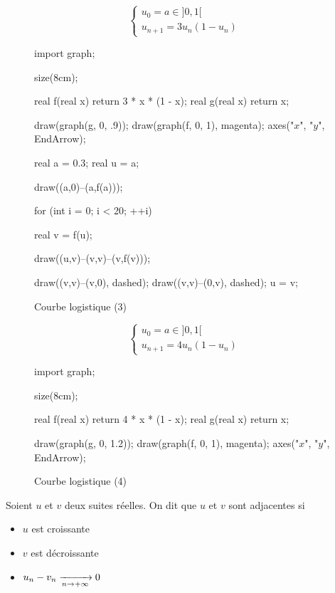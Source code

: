 \begin{exm}
	\[
	\begin{cases}
		u_0 = a \in ]0,1[\\
		u_{n+1} = 3u_n(1-u_n)
	\end{cases}
	\]
	\begin{figure}[H]
		\begin{center}
			\begin{asy}
				import graph;

				size(8cm);

				real f(real x) {return 3 * x * (1 - x); }
				real g(real x) {return x;}

				draw(graph(g, 0, .9));
				draw(graph(f, 0, 1), magenta);
				axes("$x$", "$y$", EndArrow);

				real a = 0.3;
				real u = a;

				draw((a,0)--(a,f(a)));

				for (int i = 0; i < 20; ++i) {
					real v = f(u);

					draw((u,v)--(v,v)--(v,f(v)));

					draw((v,v)--(v,0), dashed);
					draw((v,v)--(0,v), dashed);
					u = v;
				}
			\end{asy}
		\end{center}
		\caption{Courbe logistique (3)}
	 	\label{logistique-curve3}
	\end{figure}
\end{exm}

\begin{exm}
	\[
	\begin{cases}
		u_0 = a \in ]0,1[\\
		u_{n+1} = 4u_n(1-u_n)
	\end{cases}
	\]
	\begin{figure}[H]
		\begin{center}
			\begin{asy}
				import graph;

				size(8cm);

				real f(real x) {return 4 * x * (1 - x); }
				real g(real x) {return x;}

				draw(graph(g, 0, 1.2));
				draw(graph(f, 0, 1), magenta);
				axes("$x$", "$y$", EndArrow);
			\end{asy}
		\end{center}
		\caption{Courbe logistique (4)}
	 	\label{logistique-curve4}
	\end{figure}
\end{exm}

\begin{defn}
	Soient $u$ et $v$ deux suites réelles. On dit que $u$ et $v $ sont adjacentes si
	\begin{itemize}
		\item $u$ est croissante
		\item $v$ est décroissante
		\item $u_n-v_n\xrightarrow[n \to +\infty]{} 0$
	\end{itemize}
\end{defn}

